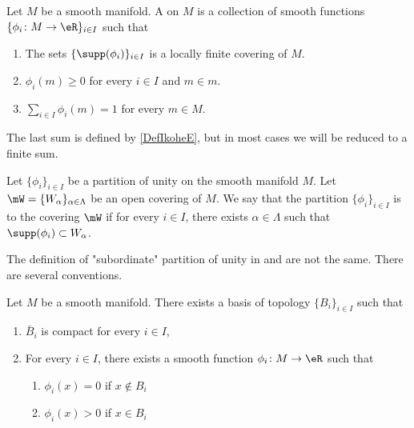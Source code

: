 \begin{definition}			\label{DEFooGEAJooInejRf}
	Let \( M\) be a smooth manifold. A  on \( M\) is a collection of smooth functions \( \{\phi_i \colon M\to \eR   \}_{i\in I}\) such that
	\begin{enumerate}
		\item		\label{ITEMooWBHEooSHUQvv}
		      The sets \( \{ \supp(\phi_i) \}_{i\in I}\) is a locally finite covering of \( M\).
		\item		\label{ITEMooSPHGooQSDFTz}
		      \( \phi_i(m)\geq 0\) for every \( i\in I\) and \( m\in m\).
		\item		\label{ITEMooGWGPooOGdAGU}
		      \( \sum_{i\in I}\phi_i(m)=1\) for every \( m\in M\).
	\end{enumerate}
	The last sum is defined by \ref{DefIkoheE}, but in most cases we will be reduced to a finite sum.
\end{definition}

\begin{definition}			\label{DEFooPJKOooFnCkuk}
	Let \( \{ \phi_i \}_{i\in I}\) be a partition of unity on the smooth manifold \( M\). Let \( \mW=\{ W_{\alpha} \}_{\alpha\in \Lambda}\) be an open covering of \( M\). We say that the partition \( \{ \phi_i \}_{i\in I}\) is  to the covering \( \mW\) if for every \( i\in I\), there exists \( \alpha\in\Lambda\) such that \( \supp(\phi_i)\subset W_{\alpha}\).
\end{definition}

\begin{normaltext}
	The definition of "subordinate" partition of unity in \cite{BIBooAQKHooVyiyN} and \cite{BIBooKCFIooSAYbJK} are not the same. There are several conventions.
\end{normaltext}

\begin{lemma}		\label{LEMooBBBNooVmpLok}
	Let \( M\) be a smooth manifold. There exists a basis of topology \( \{ B_i \}_{i\in I}\) such that
	\begin{enumerate}
		\item
		      \( \bar B_i\) is compact for every \(  i\in I\),
		\item
		      For every \( i\in I\), there exists a smooth function \(\phi_i \colon M\to \eR  \) such that
		      \begin{enumerate}
			      \item
			            \( \phi_i(x)=0\) if \( x\notin B_i\)
			      \item
			            \( \phi_i(x)>0\) if \( x\in B_i\)
		      \end{enumerate}
	\end{enumerate}
\end{lemma}

